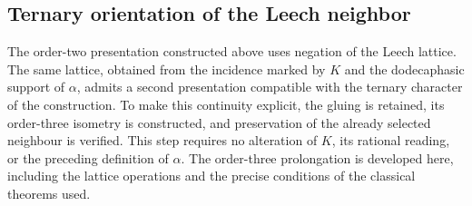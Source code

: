 


\subsection{Ternary orientation of the Leech neighbor}
\label{x_reciprocidad:km:orden-tres-reticular}

The order-two presentation constructed above uses negation
of the Leech lattice. The same lattice, obtained from the incidence marked
by \(K\) and the dodecaphasic support of \(\alpha\), admits a second
presentation compatible with the ternary character of the construction.
To make this continuity explicit, the gluing is retained, its order-three
isometry is constructed, and preservation of the already selected neighbour
is verified. This step requires no alteration of \(K\), its rational reading,
or the preceding definition of \(\alpha\). The order-three prolongation is developed here,
including the lattice operations and the precise conditions of the classical
theorems used.

